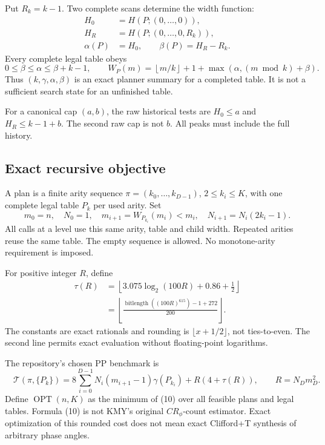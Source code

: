 \documentclass[11pt,letterpaper]{article}
\newcommand{\OPT}{\operatorname{OPT}}
\newcommand{\bits}{\operatorname{bitlength}}
\newcommand{\cost}{\mathcal T}
\begin{document}
Put \(R_k=k-1\). Two complete scans determine the width function:
\[
\begin{split}
H_0&=H(P;(0,\ldots,0)),\\
H_R&=H(P;(0,\ldots,0,R_k)),\\
\alpha(P)&=H_0,\qquad \beta(P)=H_R-R_k.
\end{split}\tag{6}
\]
Every complete legal table obeys \cite{profile}
\[
0\le\beta\le\alpha\le\beta+k-1,\qquad
W_P(m)=\left\lfloor m/k\right\rfloor+1+
       \max(\alpha,(m\bmod k)+\beta).
\tag{7}\label{eq:width}
\]
Thus \((k,\gamma,\alpha,\beta)\) is an exact planner summary for a
completed table. It is not a sufficient search state for an
unfinished table.

For a canonical cap \((a,b)\), the raw historical tests are
\(H_0\le a\) and \(H_R\le k-1+b\). The second raw cap is not \(b\).
All peaks must include the full history.

\subsection{Exact recursive objective}\label{sec:objective}
A plan is a finite arity sequence \(\pi=(k_0,\ldots,k_{D-1})\),
\(2\le k_i\le K\), with one complete legal table \(P_k\) per used arity.
Set
\[
m_0=n,\quad N_0=1,\quad
m_{i+1}=W_{P_{k_i}}(m_i)<m_i,\quad
N_{i+1}=N_i(2k_i-1).
\tag{8}
\]
All calls at a level use this same arity, table and child width.
Repeated arities reuse the same table. The empty sequence is allowed.
No monotone-arity requirement is imposed.

For positive integer \(R\), define
\[
\begin{split}
\tau(R)
 &=\left\lfloor 3.075\log_2(100R)+0.86+\tfrac12\right\rfloor\\
 &=\left\lfloor
 \frac{\bits((100R)^{615})-1+272}{200}
 \right\rfloor .
\end{split}\tag{9}\label{eq:tau}
\]
The constants are exact rationals and rounding is
\(\lfloor x+1/2\rfloor\), not ties-to-even. The second line permits
exact evaluation without floating-point logarithms.

The repository's chosen PP benchmark is
\[
\boxed{\quad
\cost(\pi,\{P_k\})=
8\sum_{i=0}^{D-1}N_i(m_{i+1}-1)\gamma(P_{k_i})
+R(4+\tau(R)),\qquad R=N_Dm_D^2 .
\quad}\tag{10}
\]
Define \(\OPT(n,K)\) as the minimum of (10) over all feasible plans
and legal tables. Formula (10) is not KMY's original
\(CR_\phi\)-count estimator. Exact optimization of this rounded cost
does not mean exact Clifford+T synthesis of arbitrary phase angles.
\end{document}
